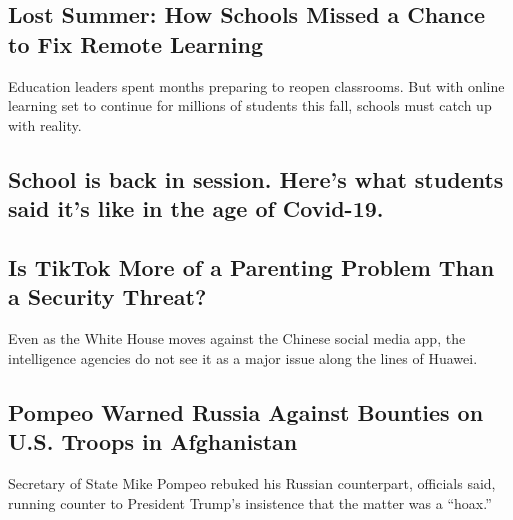 \href{/2020/08/07/us/remote-learning-fall-2020.html}{}

\hypertarget{lost-summer-how-schools-missed-a-chance-to-fix-remote-learning}{%
\subsection{Lost Summer: How Schools Missed a Chance to Fix Remote
Learning}\label{lost-summer-how-schools-missed-a-chance-to-fix-remote-learning}}

Education leaders spent months preparing to reopen classrooms. But with
online learning set to continue for millions of students this fall,
schools must catch up with reality.

\href{/2020/08/06/us/coronavirus-students.html}{}

\hypertarget{school-is-back-in-session-heres-what-students-said-its-like-in-the-age-of-covid-19}{%
\subsection{School is back in session. Here's what students said it's
like in the age of
Covid-19.}\label{school-is-back-in-session-heres-what-students-said-its-like-in-the-age-of-covid-19}}

\href{/2020/08/07/us/politics/tiktok-security-threat.html}{}

\hypertarget{is-tiktok-more-of-a-parenting-problem-than-a-security-threat}{%
\subsection{Is TikTok More of a Parenting Problem Than a Security
Threat?}\label{is-tiktok-more-of-a-parenting-problem-than-a-security-threat}}

Even as the White House moves against the Chinese social media app, the
intelligence agencies do not see it as a major issue along the lines of
Huawei.

\href{/2020/08/07/world/asia/pompeo-russia-afghanistan-bounties.html}{}

\hypertarget{pompeo-warned-russia-against-bounties-on-us-troops-in-afghanistan}{%
\subsection{Pompeo Warned Russia Against Bounties on U.S. Troops in
Afghanistan}\label{pompeo-warned-russia-against-bounties-on-us-troops-in-afghanistan}}

Secretary of State Mike Pompeo rebuked his Russian counterpart,
officials said, running counter to President Trump's insistence that the
matter was a ``hoax.''

